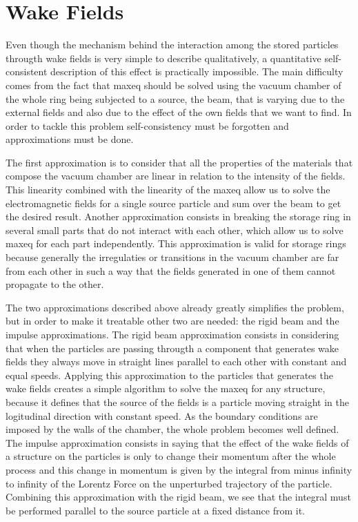 \documentclass[
	12pt,				%
	openright,			%
	oneside,			%
	a4paper,		%
	chapter=TITLE,		%
	section=TITLE,		%
    brazil,				%
	english,			%
	sumario=tradicional,
	]{abntex2}
\begin{document}
  \section{Wake Fields}\label{sec:wake_fields}

  Even though the mechanism behind the interaction among the stored particles througth wake fields is very simple to describe qualitatively, a quantitative self-consistent description of this effect is practically impossible. The main difficulty comes from the fact that \gls{maxeq} should be solved using the vacuum chamber of the whole ring being subjected to a source, the beam, that is varying due to the external fields and also due to the effect of the own fields that we want to find. In order to tackle this problem self-consistency must be forgotten and approximations must be done.

  The first approximation is to consider that all the properties of the materials that compose the vacuum chamber are linear in relation to the intensity of the fields. This linearity combined with the linearity of the \gls{maxeq} allow us to solve the electromagnetic fields for a single source particle and sum over the beam to get the desired result. Another approximation consists in breaking the storage ring in several small parts that do not interact with each other, which allow us to solve \gls{maxeq} for each part independently. This approximation is valid for storage rings because generally the irregulaties or transitions in the vacuum chamber are far from each other in such a way that the fields generated in one of them cannot propagate to the other.

  The two approximations described above already greatly simplifies the problem, but in order to make it treatable other two are needed: the rigid beam and the impulse approximations. The rigid beam approximation consists in considering that when the particles are passing througth a component that generates wake fields they always move in straight lines parallel to each other with constant and equal speeds. Applying this approximation to the particles that generates the wake fields creates a simple algorithm to solve the \gls{maxeq} for any structure, because it defines that the source of the fields is a particle moving straight in the logitudinal direction with constant speed. As the boundary conditions are imposed by the walls of the chamber, the whole problem becomes well defined. The impulse approximation consists in saying that the effect of the wake fields of a structure on the particles is only to change their momentum after the whole process and this change in momentum is given by the integral from minus infinity to infinity of the Lorentz Force on the unperturbed trajectory of the particle. Combining this approximation with the rigid beam, we see that the integral must be performed parallel to the source particle at a fixed distance from it.
\end{document}
